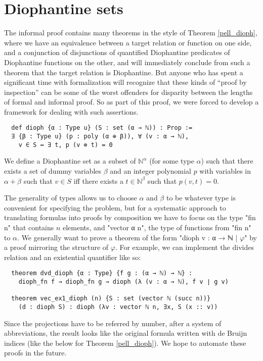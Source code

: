 \documentclass{llncs}
\newcommand{\N}{\mathbb{N}}
\begin{document}
\section{Diophantine sets}
\label{dioph}
%
The informal proof contains many theorems in the style of Theorem \ref{pell_dioph}, where we have an equivalence between a target relation or function on one side, and a conjunction of disjunctions of quantified Diophantine predicates of Diophantine functions on the other, and will immediately conclude from such a theorem that the target relation is Diophantine. But anyone who has spent a significant time with formalization will recognize that these kinds of ``proof by inspection'' can be some of the worst offenders for disparity between the lengths of formal and informal proof. So as part of this proof, we were forced to develop a framework for dealing with such assertions.
\begin{lstlisting}
  def dioph {α : Type u} (S : set (α → ℕ)) : Prop :=
  ∃ {β : Type u} (p : poly (α ⊕ β)), ∀ (v : α → ℕ),
    v ∈ S ↔ ∃ t, p (v ⊗ t) = 0
\end{lstlisting}

We define a Diophantine set as a subset of $\N^\alpha$ (for some type $\alpha$) such that there exists a set of dummy variables $\beta$ and an integer polynomial $p$ with variables in $\alpha+\beta$ such that $v\in S$ iff there exists a $t\in\N^\beta$ such that $p(v,t)=0$.

The generality of types allows us to choose $\alpha$ and $\beta$ to be whatever type is convenient for specifying the problem, but for a systematic approach to translating formulas into proofs by composition we have to focus on the type "fin n" that contains $n$ elements, and "vector α n", the type of functions from "fin n" to $\alpha$. We generally want to prove a theorem of the form "dioph {v : α → ℕ | $\varphi$}" by a proof mirroring the structure of $\varphi$. For example, we can implement the divides relation and an existential quantifier like so:

\begin{lstlisting}
  theorem dvd_dioph {α : Type} {f g : (α → ℕ) → ℕ} :
    dioph_fn f → dioph_fn g → dioph (λ (v : α → ℕ), f v ∣ g v)

  theorem vec_ex1_dioph (n) {S : set (vector ℕ (succ n))}
    (d : dioph S) : dioph (λv : vector ℕ n, ∃x, S (x :: v))
\end{lstlisting}

Since the projections have to be referred by number, after a system of abbreviations, the result looks like the original formula written with de Bruijn indices (like the below for Theorem \ref{pell_dioph}). We hope to automate these proofs in the future.
\end{document}
